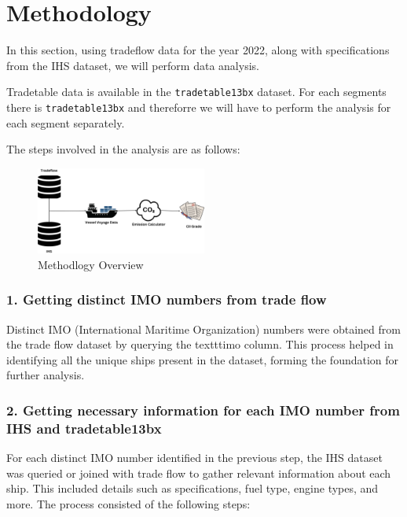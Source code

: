 \section{Methodology}


In this section, using tradeflow data for the year 2022, along with specifications from the IHS dataset, we will perform data analysis.

Tradetable data is available in the \texttt{tradetable13bx} dataset. For each segments there is \texttt{tradetable13bx} and thereforre we will have to perform the analysis for each segment separately.

The steps involved in the analysis are as follows:

\begin{figure}[h]
    \centering
    \includegraphics[width=0.5\textwidth]{images/methodlogy.png}
    \caption{Methodlogy Overview}
    \label{methodlogy}
\end{figure}

\newpage

\subsubsection{1. Getting distinct IMO numbers from trade flow}

Distinct IMO (International Maritime Organization) numbers were obtained from the trade flow dataset by querying the texttt{imo} column. 
This process helped in identifying all the unique ships present in the dataset, forming the foundation for further analysis.


\subsubsection{2. Getting necessary information for each IMO number from IHS and tradetable13bx}

For each distinct IMO number identified in the previous step, the IHS dataset was queried or joined with trade flow to gather relevant information about each ship. 
This included details such as specifications, fuel type, engine types, and more. 
The process consisted of the following steps:

